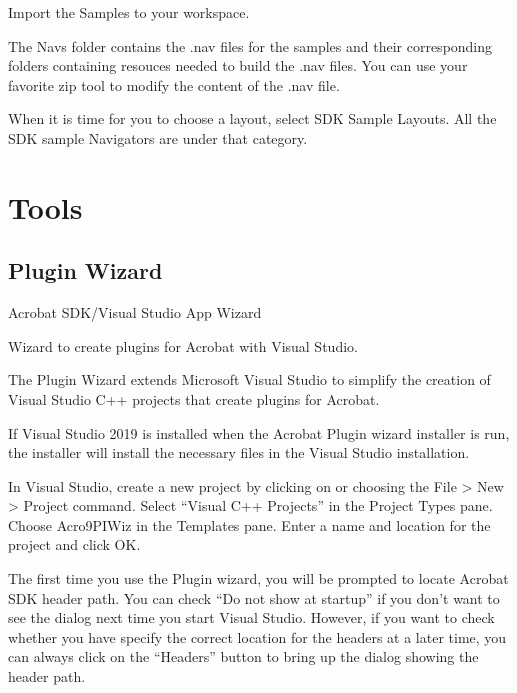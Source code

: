 \documentclass[letterpaper,12pt,english,openany,oneside]{sphinxmanual}
\begin{document}
Import the Samples to your workspace.

The Navs folder contains the .nav files for the samples and their corresponding folders containing resouces needed to build the .nav files. You can use your favorite zip tool to modify the content of the .nav file.

When it is time for you to choose a layout, select SDK Sample Layouts. All the SDK sample Navigators are under that category.


\chapter{Tools}
\label{\detokenize{Samples_Tools:tools}}\label{\detokenize{Samples_Tools::doc}}

\section{Plugin Wizard}
\label{\detokenize{Samples_Tools:plugin-wizard}}

Acrobat SDK/Visual Studio App Wizard


Wizard to create plugins for Acrobat with Visual Studio.

The Plugin Wizard extends Microsoft Visual Studio to simplify the creation of Visual Studio C++ projects that create plugins for Acrobat.


If Visual Studio 2019 is installed when the Acrobat Plugin wizard installer is run, the installer will install the necessary files in the Visual Studio installation.


In Visual Studio, create a new project by clicking on  or choosing the File > New > Project command. Select “Visual C++ Projects” in the Project Types pane. Choose Acro9PIWiz in the Templates pane. Enter a name and location for the project and click OK.

The first time you use the Plugin wizard, you will be prompted to locate Acrobat SDK header path. You can check “Do not show at startup” if you don’t want to see the dialog next time you start Visual Studio. However, if you want to check whether you have specify the correct location for the headers at a later time, you can always click on the “Headers” button to bring up the dialog showing the header path.
\end{document}
